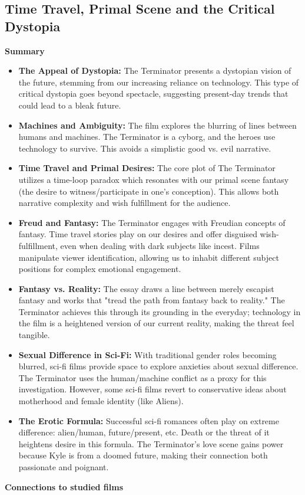 \documentclass[11pt,fleqn]{book}
\begin{document}
\subsection{Time Travel, Primal Scene and the Critical Dystopia}
\textbf{Summary}

\begin{itemize}
\item \textbf{The Appeal of Dystopia:} The Terminator presents a dystopian vision of the future, stemming from our increasing reliance on technology.  This type of critical dystopia goes beyond spectacle, suggesting present-day trends that could lead to a bleak future.

\item \textbf{Machines and Ambiguity:}  The film explores the blurring of lines between humans and machines. The Terminator is a cyborg, and the heroes use technology to survive. This avoids a simplistic good vs. evil narrative.

\item \textbf{Time Travel and Primal Desires:}  The core plot of The Terminator utilizes a time-loop paradox which resonates with our primal scene fantasy (the desire to witness/participate in one's conception). This allows both narrative complexity and wish fulfillment for the audience.

\item \textbf{Freud and Fantasy:}  The Terminator engages with Freudian concepts of fantasy. Time travel stories play on our desires and offer disguised wish-fulfillment, even when dealing with dark subjects like incest. Films manipulate viewer identification, allowing us to inhabit different subject positions for complex emotional engagement.

\item \textbf{Fantasy vs. Reality:} The essay draws a line between merely escapist fantasy and works that "tread the path from fantasy back to reality."  The Terminator achieves this through its grounding in the everyday; technology in the film is a heightened version of our current reality, making the threat feel tangible.

\item \textbf{Sexual Difference in Sci-Fi:} With traditional gender roles becoming blurred, sci-fi films provide space to explore anxieties about sexual difference.  The Terminator uses the human/machine conflict as a proxy for this investigation. However, some sci-fi films revert to conservative ideas about motherhood and female identity (like Aliens).

\item \textbf{The Erotic Formula:}  Successful sci-fi romances often play on extreme difference: alien/human, future/present, etc.  Death or the threat of it heightens desire in this formula. The Terminator's love scene gains power because Kyle is from a doomed future, making their connection both passionate and poignant.
\end{itemize}
\vspace{5pt}
\textbf{Connections to studied films}
\end{document}
